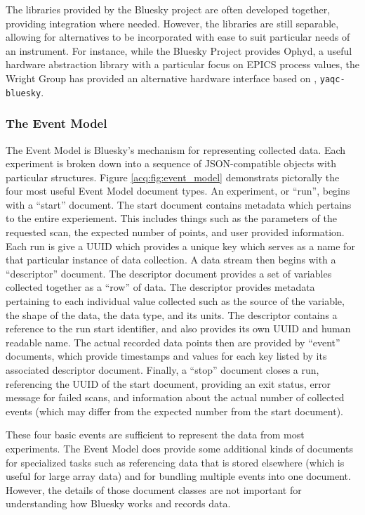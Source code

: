 The libraries provided by the Bluesky project are often developed together, providing integration where needed.
However, the libraries are still separable, allowing for alternatives to be incorporated with ease to suit particular needs of an instrument.
For instance, while the Bluesky Project provides Ophyd\cite{}, a useful hardware abstraction library with a particular focus on EPICS process values, the Wright Group has provided an alternative hardware interface based on \yaq{}, \texttt{yaqc-bluesky}\cite{}.

\subsubsection{The Event Model}

The Event Model\cite{} is Bluesky's mechanism for representing collected data.
Each experiment is broken down into a sequence of JSON-compatible objects with particular structures.
Figure \ref{acq:fig:event_model} demonstrats pictorally the four most useful Event Model document types.
An experiment, or ``run'', begins with a ``start'' document.
The start document contains metadata which pertains to the entire experiement.
This includes things such as the parameters of the requested scan, the expected number of points, and user provided information.
Each run is give a \Gls{UUID} which provides a unique key which serves as a name for that particular instance of data collection.
A data stream then begins with a ``descriptor'' document.
The descriptor document provides a set of variables collected together as a ``row'' of data.
The descriptor provides metadata pertaining to each individual value collected such as the source of the variable, the shape of the data, the data type, and its units.
The descriptor contains a reference to the run start identifier, and also provides its own \Gls{UUID} and human readable name.
The actual recorded data points then are provided by ``event'' documents, which provide timestamps and values for each key listed by its associated descriptor document.
Finally, a ``stop'' document closes a run, referencing the UUID of the start document, providing an exit status, error message for failed scans, and information about the actual number of collected events (which may differ from the expected number from the start document).

These four basic events are sufficient to represent the data from most experiments.
The Event Model does provide some additional kinds of documents for specialized tasks such as referencing data that is stored elsewhere (which is useful for large array data) and for bundling multiple events into one document.
However, the details of those document classes are not important for understanding how Bluesky works and records data.


